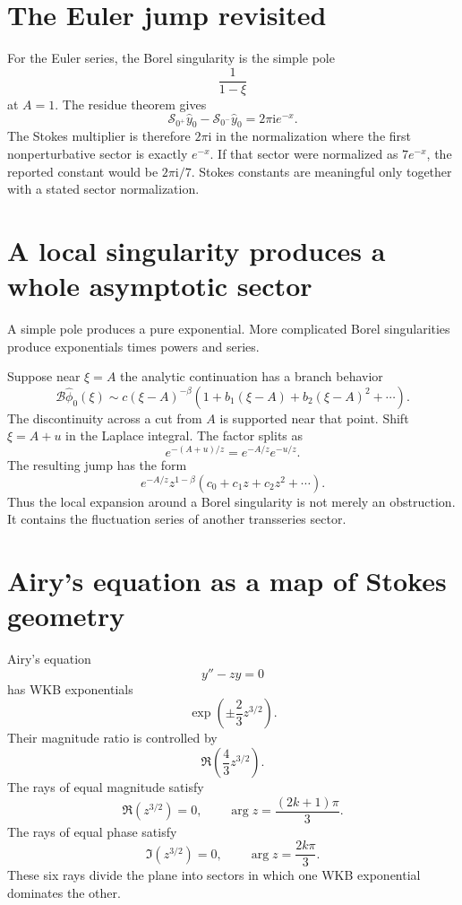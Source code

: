 \documentclass[11pt,openany]{book}
\theoremstyle{definition}
\theoremstyle{plain}
\theoremstyle{remark}
\newcommand{\ii}{\mathrm{i}}
\newcommand{\trans}[1]{\widehat{#1}}
\newcommand{\Borel}{\mathcal{B}}
\newcommand{\lateralsum}[1]{\mathcal{S}_{#1}}
\begin{document}
\section{The Euler jump revisited}

For the Euler series, the Borel singularity is the simple pole
\[
 \frac1{1-\xi}
\]
at $A=1$. The residue theorem gives
\[
 \lateralsum{0^+}\trans y_0-
 \lateralsum{0^-}\trans y_0=2\pi\ii e^{-x}.
\]
The Stokes multiplier is therefore $2\pi\ii$ in the normalization where the first nonperturbative sector is exactly $e^{-x}$. If that sector were normalized as $7e^{-x}$, the reported constant would be $2\pi\ii/7$. Stokes constants are meaningful only together with a stated sector normalization.

\section{A local singularity produces a whole asymptotic sector}

A simple pole produces a pure exponential. More complicated Borel singularities produce exponentials times powers and series.

Suppose near $\xi=A$ the analytic continuation has a branch behavior
\begin{equation}\label{eq:borel-local-branch}
 \Borel\trans\phi_0(\xi)
 \sim c(\xi-A)^{-\beta}
 \left(1+b_1(\xi-A)+b_2(\xi-A)^2+\cdots\right).
\end{equation}
The discontinuity across a cut from $A$ is supported near that point. Shift $\xi=A+u$ in the Laplace integral. The factor splits as
\[
 e^{-(A+u)/z}=e^{-A/z}e^{-u/z}.
\]
The resulting jump has the form
\begin{equation}\label{eq:borel-branch-sector}
 e^{-A/z}z^{1-\beta}
 \left(c_0+c_1z+c_2z^2+\cdots\right).
\end{equation}
Thus the local expansion around a Borel singularity is not merely an obstruction. It contains the fluctuation series of another transseries sector.

\section{Airy's equation as a map of Stokes geometry}

Airy's equation
\begin{equation}\label{eq:airy-stokes-equation}
 y''-zy=0
\end{equation}
has WKB exponentials
\begin{equation}\label{eq:airy-exponentials}
 \exp\left(\pm\frac23 z^{3/2}\right).
\end{equation}
Their magnitude ratio is controlled by
\[
 \Re\left(\frac43z^{3/2}\right).
\]
The rays of equal magnitude satisfy
\begin{equation}\label{eq:airy-equal-magnitude}
 \Re(z^{3/2})=0,
 \qquad
 \arg z=\frac{(2k+1)\pi}{3}.
\end{equation}
The rays of equal phase satisfy
\begin{equation}\label{eq:airy-equal-phase}
 \Im(z^{3/2})=0,
 \qquad
 \arg z=\frac{2k\pi}{3}.
\end{equation}
These six rays divide the plane into sectors in which one WKB exponential dominates the other.
\end{document}

